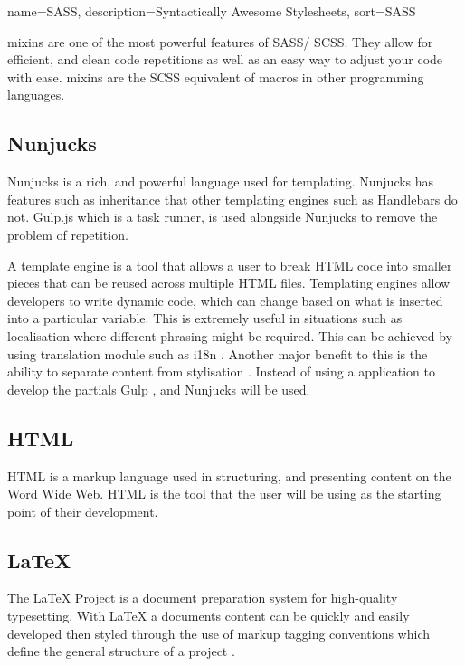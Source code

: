 %
{
  name={SASS},
  description={Syntactically Awesome Stylesheets},
  sort=SASS
}
%

\gls{mixins} are one of the most powerful features of \gls{SASS}/ \gls{SCSS}. They allow for efficient, and clean code repetitions as well as an easy way to adjust your code with ease. \gls{mixins} are the \gls{SCSS} equivalent of macros in other programming languages.

\subsection*{Nunjucks}
Nunjucks is a rich, and powerful language used for templating. Nunjucks has features such as inheritance that other templating engines such as Handlebars do not. Gulp.js which is a task runner, is used alongside Nunjucks to remove the problem of repetition. 

A template engine is a tool that allows a user to break \gls{HTML} code into smaller pieces that can be reused across multiple \gls{HTML} files. Templating engines allow developers to write dynamic code, which can change based on what is inserted into a particular variable. This is extremely useful in situations such as localisation where different phrasing might be required. This can be achieved by using translation module such as i18n \citep{NPM16}. Another major benefit to this is the ability to separate content from stylisation \citep{CONT05}. Instead of using a application to develop the partials Gulp \citep{GULP17}, and Nunjucks \citep{NUN17} will be used.

\subsection*{HTML}
\gls{HTML} is a markup language used in structuring, and presenting content on the Word Wide Web. \gls{HTML} is the tool that the user will be using as the starting point of their development.

\subsection*{LaTeX}
The LaTeX Project is a document preparation system for high-quality typesetting. With LaTeX a documents content can be quickly and easily developed then styled through the use of markup tagging conventions which define the general structure of a project \citep{LAT17}.

